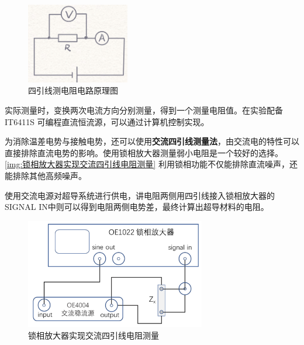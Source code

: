 \documentclass{spaexp}
\begin{document}
            \begin{figure}
                \ct
                \caption{四引线测电阻电路原理图}
                \label{img:四引线测电阻电路原理图}
                \includegraphics[width = 0.4\textwidth]{fourfoot.jpeg}
            \end{figure}

            实际测量时，变换两次电流方向分别测量，得到一个测量电阻值。在实验配备 IT6411S 可编程直流恒流源，可以通过计算机控制实现。\par

            为消除温差电势与接触电势，还可以使用{\bf{交流四引线测量法}}，由交流电的特性可以直接排除直流电势的影响。使用锁相放大器测量弱小电阻是一个较好的选择。\autoref{img:锁相放大器实现交流四引线电阻测量}
            利用锁相功能不仅能排除直流噪声，还能排除其他高频噪声。\par

            使用交流电源对超导系统进行供电，讲电阻两侧用四引线接入锁相放大器的SIGNAL IN中则可以得到电阻两侧电势差，最终计算出超导材料的电阻。
            \begin{figure}
                \ct
                \caption{锁相放大器实现交流四引线电阻测量}
                \label{img:锁相放大器实现交流四引线电阻测量}
                \includegraphics[width = 0.7\textwidth]{dcfourfoot.png}
            \end{figure}
\end{document}
